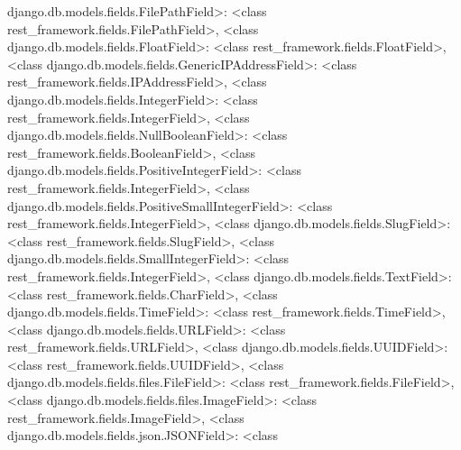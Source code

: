 \documentclass[letterpaper,10pt,english]{sphinxmanual}
\begin{document}
\begin{fulllineitems}
\begin{fulllineitems}
\textquotesingle{}django.db.models.fields.FilePathField\textquotesingle{}\textgreater{}: \textless{}class \textquotesingle{}rest\_framework.fields.FilePathField\textquotesingle{}\textgreater{}, \textless{}class \textquotesingle{}django.db.models.fields.FloatField\textquotesingle{}\textgreater{}: \textless{}class \textquotesingle{}rest\_framework.fields.FloatField\textquotesingle{}\textgreater{}, \textless{}class \textquotesingle{}django.db.models.fields.GenericIPAddressField\textquotesingle{}\textgreater{}: \textless{}class \textquotesingle{}rest\_framework.fields.IPAddressField\textquotesingle{}\textgreater{}, \textless{}class \textquotesingle{}django.db.models.fields.IntegerField\textquotesingle{}\textgreater{}: \textless{}class \textquotesingle{}rest\_framework.fields.IntegerField\textquotesingle{}\textgreater{}, \textless{}class \textquotesingle{}django.db.models.fields.NullBooleanField\textquotesingle{}\textgreater{}: \textless{}class \textquotesingle{}rest\_framework.fields.BooleanField\textquotesingle{}\textgreater{}, \textless{}class \textquotesingle{}django.db.models.fields.PositiveIntegerField\textquotesingle{}\textgreater{}: \textless{}class \textquotesingle{}rest\_framework.fields.IntegerField\textquotesingle{}\textgreater{}, \textless{}class \textquotesingle{}django.db.models.fields.PositiveSmallIntegerField\textquotesingle{}\textgreater{}: \textless{}class \textquotesingle{}rest\_framework.fields.IntegerField\textquotesingle{}\textgreater{}, \textless{}class \textquotesingle{}django.db.models.fields.SlugField\textquotesingle{}\textgreater{}: \textless{}class \textquotesingle{}rest\_framework.fields.SlugField\textquotesingle{}\textgreater{}, \textless{}class \textquotesingle{}django.db.models.fields.SmallIntegerField\textquotesingle{}\textgreater{}: \textless{}class \textquotesingle{}rest\_framework.fields.IntegerField\textquotesingle{}\textgreater{}, \textless{}class \textquotesingle{}django.db.models.fields.TextField\textquotesingle{}\textgreater{}: \textless{}class \textquotesingle{}rest\_framework.fields.CharField\textquotesingle{}\textgreater{}, \textless{}class \textquotesingle{}django.db.models.fields.TimeField\textquotesingle{}\textgreater{}: \textless{}class \textquotesingle{}rest\_framework.fields.TimeField\textquotesingle{}\textgreater{}, \textless{}class \textquotesingle{}django.db.models.fields.URLField\textquotesingle{}\textgreater{}: \textless{}class \textquotesingle{}rest\_framework.fields.URLField\textquotesingle{}\textgreater{}, \textless{}class \textquotesingle{}django.db.models.fields.UUIDField\textquotesingle{}\textgreater{}: \textless{}class \textquotesingle{}rest\_framework.fields.UUIDField\textquotesingle{}\textgreater{}, \textless{}class \textquotesingle{}django.db.models.fields.files.FileField\textquotesingle{}\textgreater{}: \textless{}class \textquotesingle{}rest\_framework.fields.FileField\textquotesingle{}\textgreater{}, \textless{}class \textquotesingle{}django.db.models.fields.files.ImageField\textquotesingle{}\textgreater{}: \textless{}class \textquotesingle{}rest\_framework.fields.ImageField\textquotesingle{}\textgreater{}, \textless{}class \textquotesingle{}django.db.models.fields.json.JSONField\textquotesingle{}\textgreater{}: \textless{}class 
\end{fulllineitems}
\end{fulllineitems}
\end{document}

